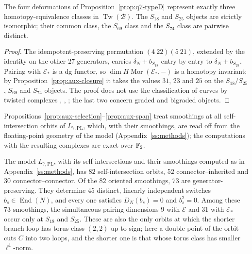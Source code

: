\begin{corollary}\label{cor:q7-classes}
The four deformations of Proposition~\ref{prop:q7-typeD} represent exactly three homotopy-equivalence
classes in $\operatorname{Tw}(\mathcal B)$.  The $S_{18}$ and $S_{25}$ objects are strictly isomorphic;
their common class, the $S_{69}$ class and the $S_{74}$ class are pairwise distinct.
\end{corollary}

\begin{proof}
The idempotent-preserving permutation $(4\ 22)(5\ 21)$, extended by the identity on the other $27$
generators, carries $\delta_N+b_{S_{18}}$ entry by entry to $\delta_N+b_{S_{25}}$.  Pairing with
$\mathcal E_*$ is a dg functor, so $\dim H\operatorname{Mor}(\mathcal E_*,-)$ is a homotopy invariant;
by Proposition~\ref{prop:aux-closure} it takes the values $31$, $23$ and $25$ on the $S_{18}/S_{25}$,
$S_{69}$ and $S_{74}$ objects.  The proof does not use the classification of curves by twisted
complexes \cite[\S11.5]{CHKK}, \cite[Thm.~4.3]{HKK}, \cite[Thm.~1.5]{KWZ}; the last two concern graded and
bigraded objects.
\end{proof}

Propositions~\ref{prop:aux-selection}--\ref{prop:aux-span} treat smoothings at all self-intersection orbits
of $L_{7,\mathrm{PL}}$, which, with their smoothings, are read off from the floating-point geometry of the
model (Appendix~\ref{ss:methods}); the computations with the resulting complexes are exact over $\mathbb{F}_2$.

\begin{proposition}\label{prop:aux-selection}
The model $L_{7,\mathrm{PL}}$, with its self-intersections and their smoothings computed as in
Appendix~\ref{ss:methods}, has $82$ self-intersection orbits, $52$ connector--inherited and $30$
connector--connector.  Of the $82$ oriented smoothings, $73$ are generator-preserving.  They determine
$45$ distinct, linearly independent switches $b_s\in\operatorname{End}(N)$, and every one satisfies
$D_N(b_s)=0$ and $b_s^2=0$.  Among these $73$ smoothings, the simultaneous pairing dimensions $9$
with $\mathcal E$ and $31$ with $\mathcal E_*$ occur only at $S_{18}$ and $S_{25}$.  These are
also the only orbits at which the shorter branch loop has torus class $(2,2)$ up to sign; here a double
point of the orbit cuts $C$ into two loops, and the shorter one is that whose torus class has smaller
$\ell^1$-norm.
\end{proposition}

